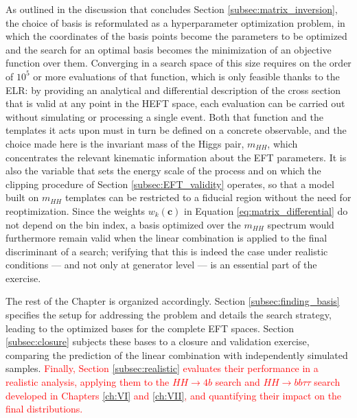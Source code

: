 As outlined in the discussion that concludes Section \ref{subsec:matrix_inversion}, the choice of basis is reformulated as a hyperparameter optimization problem, in which the coordinates of the basis points become the parameters to be optimized and the search for an optimal basis becomes the minimization of an objective function over them. Converging in a search space of this size requires on the order of $10^5$ or more evaluations of that function, which is only feasible thanks to the ELR: by providing an analytical and differential description of the cross section that is valid at any point in the HEFT space, each evaluation can be carried out without simulating or processing a single event. Both that function and the templates it acts upon must in turn be defined on a concrete observable, and the choice made here is the invariant mass of the Higgs pair, $m_{HH}$, which concentrates the relevant kinematic information about the EFT parameters. It is also the variable that sets the energy scale of the process and on which the clipping procedure of Section \ref{subsec:EFT_validity} operates, so that a model built on $m_{HH}$ templates can be restricted to a fiducial region without the need for reoptimization. Since the weights $w_k(\mathbf{c})$ in Equation \ref{eq:matrix_differential} do not depend on the bin index, a basis optimized over the $m_{HH}$ spectrum would furthermore remain valid when the linear combination is applied to the final discriminant of a search; verifying that this is indeed the case under realistic conditions — and not only at generator level — is an essential part of the exercise.

The rest of the Chapter is organized accordingly. Section \ref{subsec:finding_basis} specifies the setup for addressing the problem and details the search strategy, leading to the optimized bases for the complete EFT spaces. Section \ref{subsec:closure} subjects these bases to a closure and validation exercise, comparing the prediction of the linear combination with independently simulated samples. \textcolor{red}{Finally, Section \ref{subsec:realistic} evaluates their performance in a realistic analysis, applying them to the $HH\to 4b$ search and $HH\to bb\tau\tau$ search developed in Chapters \ref{ch:VI} and \ref{ch:VII}, and quantifying their impact on the final distributions.}

